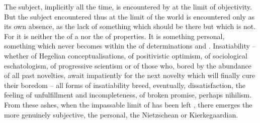 The subject, implicitly  all the time, is encountered by
 at the limit of {objectivity}.  But the subject encountered thus
at the limit of the world is encountered only as its own absence, as the lack of
something which should be there but which is not.  For it is neither the
 of a  nor the  of
 properties.  It is something personal, something which never
becomes  within the  of 
determinations and  . Insatiability -- whether of
Hegelian conceptualisations, of positivistic optimism, of sociological
eschatologism, of progressive scientism or of those who, bored by the abundance
of all past novelties, await impatiently for the next novelty which will finally
cure their boredom -- all forms of insatiability breed, eventually,
dissatisfaction, the feeling of unfulfillment and incompleteness, of broken
promise, perhaps nihilism. From these ashes, when the impassable limit of
 has been left , there emerges the more genuinely
subjective, the personal, the Nietzschean or Kierkegaardian.

